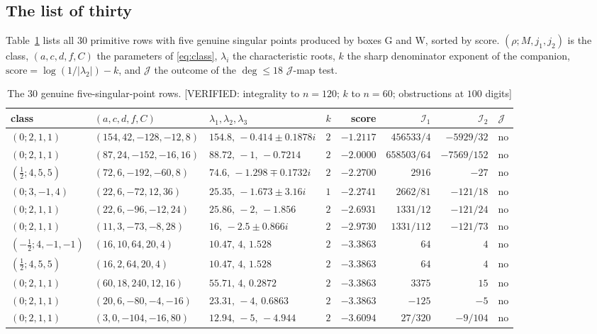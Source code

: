 \documentclass[11pt,reqno]{amsart}
\theoremstyle{plain}
\theoremstyle{definition}
\theoremstyle{remark}
\theoremstyle{plain}
\newcommand{\Jm}{\mathcal J}
\newcommand{\Ic}{\mathcal I}
\newcommand{\Verified}[1]{\textup{\textsf{[VERIFIED: #1]}}}
\begin{document}
\subsection{The list of thirty}\label{sec:thirty}
Table~\ref{tab:thirty} lists all $30$ primitive rows with five genuine singular
points produced by boxes G and W, sorted by score. $(\rho;M,j_1,j_2)$ is the
class, $(a,c,d,f,C)$ the parameters of \eqref{eq:class}, $\lambda_i$ the
characteristic roots, $k$ the sharp denominator exponent of the companion,
$\text{score}=\log(1/|\lambda_2|)-k$, and $\Jm$ the outcome of the
$\deg\le18$ $\Jm$-map test.

\begin{table}[htbp]\centering\scriptsize
\setlength{\tabcolsep}{3.5pt}
\caption{The $30$ genuine five-singular-point rows. \Verified{integrality to
$n=120$; $k$ to $n=60$; obstructions at $100$ digits}}\label{tab:thirty}
\begin{tabular}{llllrrrl}
\toprule
class & $(a,c,d,f,C)$ & $\lambda_1,\lambda_2,\lambda_3$ & $k$ & score & $\Ic_1$ & $\Ic_2$ & $\Jm$\\
\midrule
$(0;2,1,1)$ & $(154,42,-128,-12,8)$ & $154.8,\,-0.414\pm0.1878i$ & $2$ & $-1.2117$ & $456533/4$ & $-5929/32$ & no\\
$(0;2,1,1)$ & $(87,24,-152,-16,16)$ & $88.72,\,-1,\,-0.7214$ & $2$ & $-2.0000$ & $658503/64$ & $-7569/152$ & no\\
$(\tfrac12;4,5,5)$ & $(72,6,-192,-60,8)$ & $74.6,\,-1.298\mp0.1732i$ & $2$ & $-2.2700$ & $2916$ & $-27$ & no\\
$(0;3,-1,4)$ & $(22,6,-72,12,36)$ & $25.35,\,-1.673\pm3.16i$ & $1$ & $-2.2741$ & $2662/81$ & $-121/18$ & no\\
$(0;2,1,1)$ & $(22,6,-96,-12,24)$ & $25.86,\,-2,\,-1.856$ & $2$ & $-2.6931$ & $1331/12$ & $-121/24$ & no\\
$(0;2,1,1)$ & $(11,3,-73,-8,28)$ & $16,\,-2.5\pm0.866i$ & $2$ & $-2.9730$ & $1331/112$ & $-121/73$ & no\\
$(-\tfrac12;4,-1,-1)$ & $(16,10,64,20,4)$ & $10.47,\,4,\,1.528$ & $2$ & $-3.3863$ & $64$ & $4$ & no\\
$(\tfrac12;4,5,5)$ & $(16,2,64,20,4)$ & $10.47,\,4,\,1.528$ & $2$ & $-3.3863$ & $64$ & $4$ & no\\
$(0;2,1,1)$ & $(60,18,240,12,16)$ & $55.71,\,4,\,0.2872$ & $2$ & $-3.3863$ & $3375$ & $15$ & no\\
$(0;2,1,1)$ & $(20,6,-80,-4,-16)$ & $23.31,\,-4,\,0.6863$ & $2$ & $-3.3863$ & $-125$ & $-5$ & no\\
$(0;2,1,1)$ & $(3,0,-104,-16,80)$ & $12.94,\,-5,\,-4.944$ & $2$ & $-3.6094$ & $27/320$ & $-9/104$ & no\\

\end{tabular}
\end{table}
\end{document}
